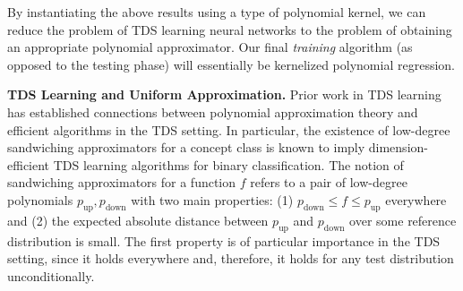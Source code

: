 \documentclass[11pt]{article} %
\numberwithin{equation}{section}
\begin{document}







By instantiating the above results using a type of polynomial kernel, we can reduce the problem of TDS learning neural networks to the problem of obtaining an appropriate polynomial approximator.  Our final {\em training} algorithm (as opposed to the testing phase) will essentially be kernelized polynomial regression. 


\noindent\textbf{TDS Learning and Uniform Approximation.} Prior work in TDS learning has established connections between polynomial approximation theory and efficient algorithms in the TDS setting. In particular, the existence of low-degree sandwiching approximators for a concept class is known to imply dimension-efficient TDS learning algorithms for binary classification. The notion of sandwiching approximators for a function $f$ refers to a pair of low-degree polynomials $p_{\mathrm{up}}, p_{\mathrm{down}}$ with two main properties: (1) $p_{\mathrm{down}} \le f\le p_{\mathrm{up}}$ everywhere and (2) the expected absolute distance between $p_{\mathrm{up}}$ and $p_{\mathrm{down}}$ over some reference distribution is small. The first property is of particular importance in the TDS setting, since it holds everywhere and, therefore, it holds for any test distribution unconditionally.
\end{document}
